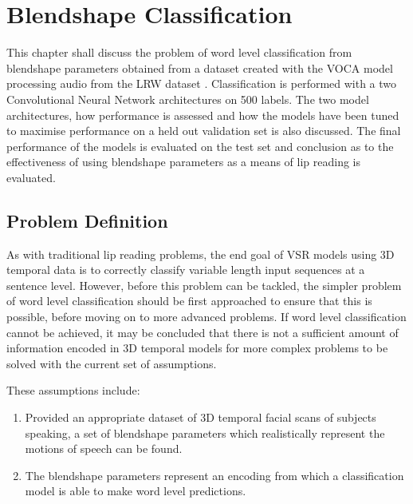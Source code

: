 



\chapter{Blendshape Classification}\label{chap:classification}

This chapter shall discuss the problem of word level classification from blendshape parameters obtained from a dataset created with the VOCA model \cite{Cudeiro2019} processing audio from the LRW dataset \cite{Chung2016}.
Classification is performed with a two Convolutional Neural Network architectures on 500 labels.
The two model architectures, how performance is assessed and how the models have been tuned to maximise performance on a held out validation set is also discussed. 
The final performance of the models is evaluated on the test set and conclusion as to the effectiveness of using blendshape parameters as a means of lip reading is evaluated.

\section{Problem Definition}
As with traditional lip reading problems, the end goal of VSR models using 3D temporal data is to correctly classify variable length input sequences at a sentence level.
However, before this problem can be tackled, the simpler problem of word level classification should be first approached to ensure that this is possible, before moving on to more advanced problems.
If word level classification cannot be achieved, it may be concluded that there is not a sufficient amount of information encoded in 3D temporal models for more complex problems to be solved with the current set of assumptions.

These assumptions include:
\begin{enumerate}
    \item Provided an appropriate dataset of 3D temporal facial scans of subjects speaking, a set of blendshape parameters which realistically represent the motions of speech can be found. \label{assumption:class_1}
    \item The blendshape parameters represent an encoding from which a classification model is able to make word level predictions. \label{assumption:class_2}
\end{enumerate}

